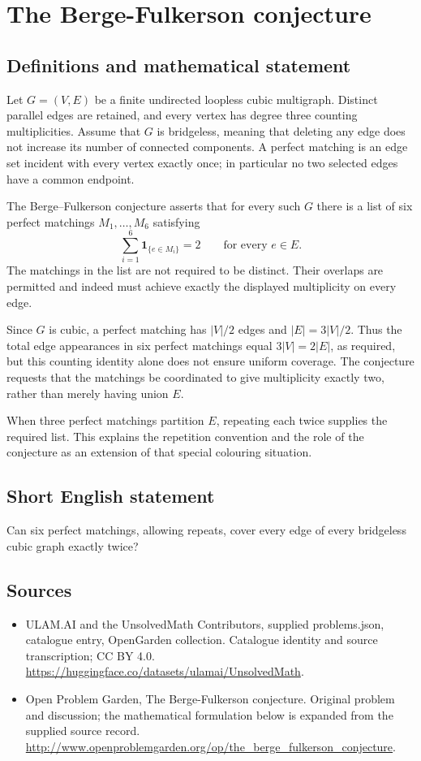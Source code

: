 \documentclass[11pt,a4paper]{article}
\begin{document}
\section*{The Berge-Fulkerson conjecture}\label{statement}

\subsection{Definitions and mathematical statement}
Let $G=(V,E)$ be a finite undirected loopless cubic
multigraph. Distinct parallel edges are retained, and
every vertex has degree three counting multiplicities.
Assume that $G$ is bridgeless, meaning that deleting any
edge does not increase its number of connected components.
A perfect matching is an edge set incident with every
vertex exactly once; in particular no two selected edges
have a common endpoint.

The Berge--Fulkerson conjecture asserts that for every
such $G$ there is a list of six perfect matchings
$M_1,\ldots,M_6$ satisfying
\[
 \sum_{i=1}^6\mathbf1_{\{e\in M_i\}}=2
 \qquad\text{for every }e\in E.
\]
The matchings in the list are not required to be distinct.
Their overlaps are permitted and indeed must achieve
exactly the displayed multiplicity on every edge.

Since $G$ is cubic, a perfect matching has $|V|/2$ edges
and $|E|=3|V|/2$. Thus the total edge appearances in six
perfect matchings equal $3|V|=2|E|$, as required, but
this counting identity alone does not ensure uniform
coverage. The conjecture requests that the matchings be
coordinated to give multiplicity exactly two, rather than
merely having union $E$.

When three perfect matchings partition $E$, repeating
each twice supplies the required list. This explains the
repetition convention and the role of the conjecture as
an extension of that special colouring situation.
\subsection{Short English statement}
Can six perfect matchings, allowing repeats, cover every edge of every bridgeless cubic graph exactly twice?
\subsection{Sources}
\begin{itemize}
\item[S1] ULAM.AI and the UnsolvedMath Contributors, supplied problems.json, catalogue entry, OpenGarden collection. Catalogue identity and source transcription; CC BY 4.0.
\url{https://huggingface.co/datasets/ulamai/UnsolvedMath}.
\item[S2] Open Problem Garden, The Berge-Fulkerson conjecture. Original problem and discussion; the mathematical formulation below is expanded from the supplied source record.
\url{http://www.openproblemgarden.org/op/the_berge_fulkerson_conjecture}.
\end{itemize}
\end{document}
